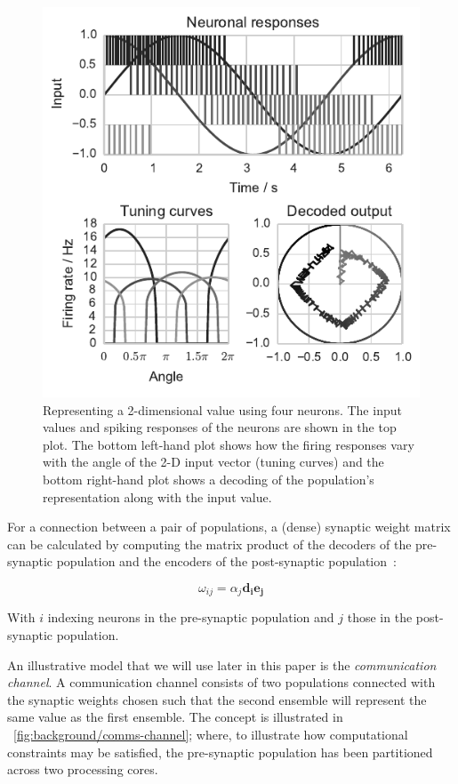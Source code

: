 \documentclass[conference]{IEEEtran}
\renewcommand{\vec}{\mathbf}  %
\begin{document}
  \begin{figure}[!t]
    \includegraphics{figures/nef-1}
    \caption{%
      Representing a 2-dimensional value using four neurons. The input values and spiking responses of the neurons are shown in the top plot.
      The bottom left-hand plot shows how the firing responses vary with the angle of the 2-D input vector (tuning curves) and the bottom right-hand plot shows a decoding of the population's representation along with the input value.}
    \label{fig:background/nef-1}
  \end{figure}

For a connection between a pair of populations, a (dense) synaptic weight matrix can be calculated by computing the matrix product of the decoders of the pre-synaptic population and the encoders of the post-synaptic population~\parencite{Stewart2014}:

\begin{equation}
  \omega_{ij} = \alpha_j \vec{d_i}\vec{e_j}  \label{eq:weights}
\end{equation}

With $i$ indexing neurons in the pre-synaptic population and $j$ those in the post-synaptic population.

An illustrative model that we will use later in this paper is the \textit{communication channel}.
  A communication channel consists of two populations connected with the synaptic weights chosen such that the second ensemble will represent the same value as the first ensemble.
  The concept is illustrated in \figurename~\ref{fig:background/comms-channel}; where, to illustrate how computational constraints may be satisfied, the pre-synaptic population has been partitioned across two processing cores.
\end{document}
